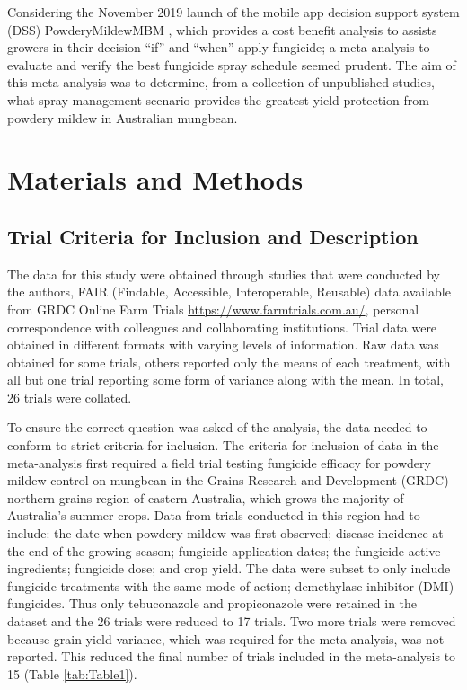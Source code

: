 \documentclass[agronomy,article,submit,moreauthors,pdftex]{mdpi}
\begin{document}
Considering the November 2019 launch of the mobile app decision support system (DSS) PowderyMildewMBM \citep{Diggle}, which provides a cost benefit analysis to assists growers in their decision ``if'' and ``when'' apply fungicide; a meta-analysis to evaluate and verify the best fungicide spray schedule seemed prudent.
The aim of this meta-analysis was to determine, from a collection of unpublished studies, what spray management scenario provides the greatest yield protection from powdery mildew in Australian mungbean.

\hypertarget{materials-and-methods}{%
\section{Materials and Methods}\label{materials-and-methods}}

\hypertarget{trial-criteria-for-inclusion-and-description}{%
\subsection{Trial Criteria for Inclusion and Description}\label{trial-criteria-for-inclusion-and-description}}

The data for this study were obtained through studies that were conducted by the authors, FAIR (Findable, Accessible, Interoperable, Reusable) data available from GRDC Online Farm Trials \url{https://www.farmtrials.com.au/}, personal correspondence with colleagues and collaborating institutions.
Trial data were obtained in different formats with varying levels of information.
Raw data was obtained for some trials, others reported only the means of each treatment, with all but one trial reporting some form of variance along with the mean.
In total, 26 trials were collated.

To ensure the correct question was asked of the analysis, the data needed to conform to strict criteria for inclusion.
The criteria for inclusion of data in the meta-analysis first required a field trial testing fungicide efficacy for powdery mildew control on mungbean in the Grains Research and Development (GRDC) northern grains region of eastern Australia, which grows the majority of Australia's summer crops.
Data from trials conducted in this region had to include: the date when powdery mildew was first observed; disease incidence at the end of the growing season; fungicide application dates; the fungicide active ingredients; fungicide dose; and crop yield.
The data were subset to only include fungicide treatments with the same mode of action; demethylase inhibitor (DMI) fungicides.
Thus only tebuconazole and propiconazole were retained in the dataset and the 26 trials were reduced to 17 trials.
Two more trials were removed because grain yield variance, which was required for the meta-analysis, was not reported.
This reduced the final number of trials included in the meta-analysis to 15 (Table \ref{tab:Table1}).
\end{document}
